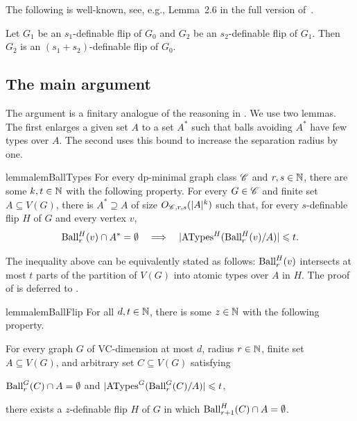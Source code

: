 The following is well-known, see, e.g., Lemma~2.6 in the full version of~\cite{flippers}.

\begin{fact}\label{lem:definable-flip-transitive}
    Let $G_1$ be an $s_1$-definable flip of $G_0$ and $G_2$ be an $s_2$-definable flip of $G_1$. Then $G_2$ is an $(s_1 + s_2)$-definable flip of $G_0$.
\end{fact}


\subsection{The main argument}\label{sec:closures-main}

The argument is a finitary analogue of the reasoning in \cite[Section 7]{flippers}.
We use two lemmas. The first enlarges a given set $A$ to a set $A^*$ such that balls avoiding $A^*$ have few types over $A$. The second uses this bound to increase the separation radius by one.

\begin{restatable}{lemma}{lemBallTypes}\label{lem:ball-types}
    For every dp-minimal graph class $\mathscr C$ and $r,s\in\mathbb N$, there are some $k,t\in\mathbb N$ with the following property.
    For every $G\in\mathscr C$ and finite set $A\subseteq V(G)$, there is $A^*\supseteq A$ of size $O_{\mathscr C,r,s}(|A|^k)$ such that, for every $s$-definable flip $H$ of $G$ and every vertex $v$,
    \[
        \operatorname{Ball}_r^H(v)\cap A^*=\emptyset
        \quad\Longrightarrow\quad
        |\mathrm{ATypes}^H(\operatorname{Ball}_r^H(v)/A)|\leqslant t.
    \]
\end{restatable}

The inequality above
can be equivalently stated as follows:
 $\operatorname{Ball}_r^H(v)$ intersects at most $t$ parts of 
the partition of $V(G)$ into atomic types over $A$ in $H$.
The proof of  is deferred to .


\begin{restatable}{lemma}{lemBallFlip}\label{lem:ball-flip}
For all $d,t\in \mathbb N$, there is some $z\in\mathbb N$ with the following property.

\smallskip\noindent
For every graph $G$ of VC-dimension at most $d$, radius $r\in\mathbb N$, finite set $A\subseteq V(G)$, and arbitrary set $C\subseteq V(G)$ satisfying
\begin{center}
    $\operatorname{Ball}_r^G(C) \cap A = \emptyset$
    \qquad and \qquad
    $|\mathrm{ATypes}^G(\operatorname{Ball}_r^G(C)/A)|\leqslant t$,
\end{center}
there exists a $z$-definable flip $H$ of $G$ in which $\operatorname{Ball}_{r+1}^H(C) \cap A = \emptyset$.
\end{restatable}

